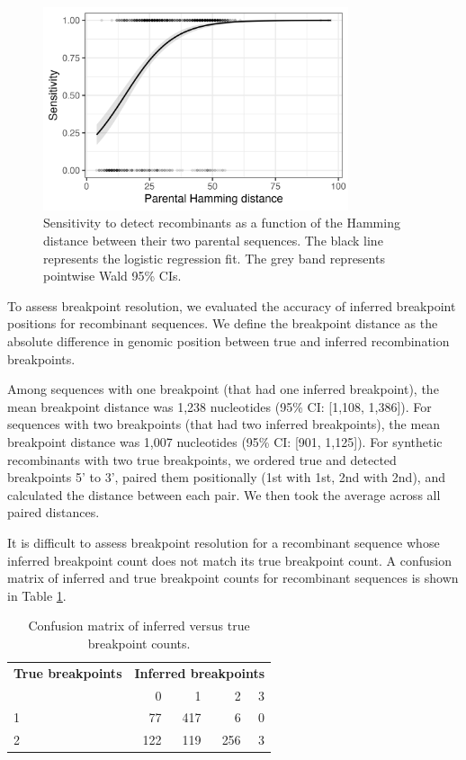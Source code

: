 \documentclass[11pt,oneside,letterpaper]{article}
\begin{document}
\begin{figure}[H]
  \centering
  \includegraphics[width=0.8\textwidth]{figures/hmm/sens_vs_parentdist_ggplot.png}
  \caption[Sensitivity dist]{
    Sensitivity to detect recombinants as a function of the Hamming distance between their two parental sequences. The black line represents the logistic regression fit. The grey band represents pointwise Wald 95\% CIs. 
  }
  \label{fig:sens_vs_edits}
\end{figure}

To assess breakpoint resolution, we evaluated the accuracy of inferred breakpoint positions for recombinant sequences. We define the breakpoint distance as the absolute difference in genomic position between true and inferred recombination breakpoints. 

Among sequences with one breakpoint (that had one inferred breakpoint), the mean breakpoint distance was 1,238 nucleotides (95\% CI: [1,108, 1,386]). For sequences with two breakpoints (that had two inferred breakpoints), the mean breakpoint distance was 1,007 nucleotides (95\% CI: [901, 1,125]). For synthetic recombinants with two true breakpoints, we ordered true and detected breakpoints 5' to 3', paired them positionally (1st with 1st, 2nd with 2nd), and calculated the distance between each pair. We then took the average across all paired distances. 

It is difficult to assess breakpoint resolution for a recombinant sequence whose inferred breakpoint count does not match its true breakpoint count. A confusion matrix of inferred and true breakpoint counts for recombinant sequences is shown in Table \ref{tab:bp_confusion}.

\begin{table}[htbp]
\centering
\footnotesize
\begin{tabular}{@{}lrrrr@{}}
\toprule
\multicolumn{1}{c}{\textbf{True breakpoints}} &
\multicolumn{4}{c}{\textbf{Inferred breakpoints}} \\ \cmidrule(l){2-5}
 & 0 & 1 & 2 & 3 \\ \midrule
1 & 77 & 417 &   6 &  0 \\
2 & 122 &  119 & 256 &  3 \\ \bottomrule
\end{tabular}
\caption[Confusion matrix of inferred versus true breakpoint counts]{Confusion matrix of inferred versus true breakpoint counts.}
\label{tab:bp_confusion}
\end{table}
\end{document}
